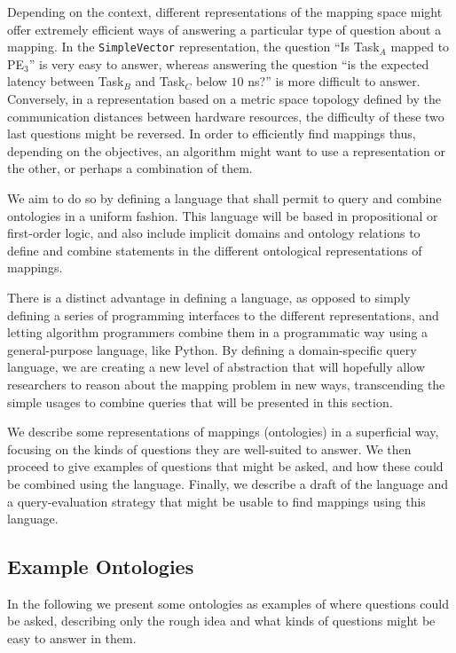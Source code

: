 Depending on the context, different representations of the mapping space might offer extremely efficient ways of answering a particular type of question about a mapping.
In the \texttt{SimpleVector} representation, the question ``Is Task$_A$ mapped to PE$_3$'' is very easy to answer, whereas answering the question ``is the expected latency between Task$_B$ and Task$_C$ below $10$ ns?'' is more difficult to answer.
Conversely, in a representation based on a metric space topology defined by the communication distances between hardware resources, the difficulty of these two last questions might be reversed.
In order to efficiently find mappings thus, depending on the objectives, an algorithm might want to use a representation or the other, or perhaps a combination of them.

We aim to do so by defining a language that shall permit to query and combine ontologies in a uniform fashion.
This language will be based in propositional or first-order logic, and also include implicit domains and ontology relations to define and combine statements in the different ontological representations of mappings.

There is a distinct advantage in defining a language, as opposed to simply defining a series of programming interfaces to the different representations, and letting algorithm programmers combine them in a programmatic way using a general-purpose language, like Python.
By defining a domain-specific query language, we are creating a new level of abstraction that will hopefully allow researchers to reason about the mapping problem in new ways, transcending the simple usages to combine queries that will be presented in this section.

We describe some representations of mappings (ontologies) in a superficial way, focusing on the kinds of questions they are well-suited to answer.
We then proceed to give examples of questions that might be asked, and how these could be combined using the language.
Finally, we describe a draft of the language and a query-evaluation strategy that might be usable to find mappings using this language.

\subsection{Example Ontologies}

In the following we present some ontologies as examples of where questions could be asked, describing only the rough idea and what kinds of questions might be easy to answer in them.

